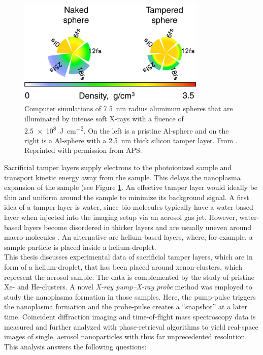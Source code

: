 %
\begin{figure}
	\centering
		\includegraphics[width=0.80\textwidth]{images/tamper-layer.png}
	\caption[Computer simulations of \SI{7.5}{\nano\meter} radius aluminum spheres with tamper layers]{Computer simulations of \SI{7.5}{\nano\meter} radius aluminum spheres that are illuminated by intense soft X-rays with a fluence of \SI{2.5e8}{\joule\per\square\centi\meter}. On the left is a pristine Al-sphere and on the right is a Al-sphere with a \SI{2.5}{\nano\meter} thick silicon tamper layer. From \citep{Hau-Riege-2010-PRL}. Reprinted with permission from APS.}
	\label{fig:tamper-layer}
\end{figure}
%
Sacrificial tamper layers supply electrons to the photoionized sample and transport kinetic energy away from the sample. This delays the nanoplasma expansion of the sample (see Figure \ref{fig:tamper-layer}. An effective tamper layer would ideally be thin and uniform around the sample to minimize its background signal. A first idea of a tamper layer is water, since bio-molecules typically have a water-based layer when injected into the imaging setup via an aerosol gas jet. However, water-based layers become disordered in thicker layers and are usually uneven around macro-molecules \citep{Aquila-2015-StrucDyn}. An alternative are helium-based layers, where, for example, a sample particle is placed inside a helium-droplet.\\[1\baselineskip]
%
This thesis discusses experimental data of sacrificial tamper layers, which are in form of a helium-droplet, that has been placed around xenon-clusters, which represent the aerosol sample. The data is complemented by the study of pristine Xe- and He-clusters. A novel \textit{X-ray pump--X-ray probe} method was employed to study the nanoplasma formation in those samples. Here, the pump-pulse triggers the nanoplasma formation and the probe-pulse creates a ``snapshot'' at a later time. Coincident diffraction imaging and time-of-flight mass spectroscopy data is measured and further analyzed with phase-retrieval algorithms to yield real-space images of single, aerosol nanoparticles with thus far unprecedented resolution. This analysis answers the following questions:
